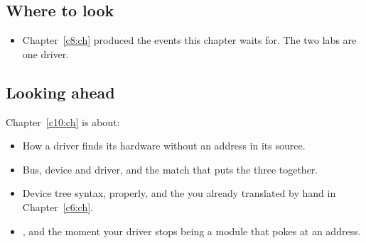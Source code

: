\subsection*{Where to look}
\begin{itemize}
  \item Chapter~\ref{c8:ch} produced the events this chapter waits for. The two labs are one driver.
\end{itemize}

\subsection*{Looking ahead}
Chapter~\ref{c10:ch} is about:
\begin{itemize}
  \item How a driver finds its hardware without an address in its source.
  \item Bus, device and driver, and the match that puts the three together.
  \item Device tree syntax, properly, and the  you already translated by hand in
    Chapter~\ref{c6:ch}.
  \item {}, and the moment your driver stops being a module that pokes at an address.
\end{itemize}
